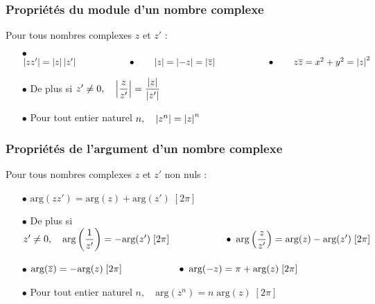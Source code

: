 \subsubsection*{Propriétés du module d'un nombre complexe}
Pour tous nombres complexes $z $ et $z' $ :

\medskip

\begin{itemize}
\item[$  \bullet$]  $ \left\lvert zz' \right\rvert =\left\lvert z \right\rvert\left\lvert z' \right\rvert
\hspace*{2cm}   \bullet  \qquad    \left\lvert z \right\rvert =\left\lvert -z \right\rvert =\left\lvert \overline{z} \right\rvert \hspace*{2cm}   \bullet  \qquad    z\overline{z}=x^2+y^2=\left\lvert z \right\rvert^2$


\medskip

\item[$  \bullet$]  De plus si $ z'\neq 0,  \quad   \left\lvert  \dfrac{z}{z'}  \right\rvert= \dfrac{\left\lvert z \right\rvert}{\left\lvert z' \right\rvert}$

\medskip
 \item[$  \bullet$] Pour tout entier naturel $ n, \quad  \left\lvert z^n \right\rvert =\left\lvert z \right\rvert^n$
\end{itemize}



\subsubsection*{Propriétés de l'argument d'un nombre complexe}
Pour tous nombres complexes $z $ et $z' $ non nuls :

\medskip

\begin{itemize}
\item[$  \bullet$]  $ \text{arg}(zz') =\text{arg}(z) +\text{arg}(z') \; [2\pi]$
 \item[$  \bullet$]   De plus si $ z'\neq 0,  \quad   \text{arg}\left(\dfrac{1}{z'}\right)=-\text{arg}(z')\; [2\pi] \hspace*{2cm}   \bullet  \;  \text{arg}\left(\dfrac{z}{z'}\right)=\text{arg}(z)- \text{arg}(z') \; [2\pi]$ 


\medskip

\item[$  \bullet$]   $ \text{arg}(\overline{z})=-\text{arg}(z) \; [2\pi]\hspace*{2cm}   \bullet \;  \text{arg}(-z)=\pi +\text{arg}(z) \; [2\pi]$

\medskip
 \item[$  \bullet$] Pour tout entier naturel $ n, \quad  \text{arg}(z^n) =n \; \text{arg}(z) \; [2\pi]$
\end{itemize}

